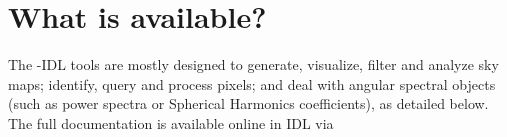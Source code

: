 \section{What is available?}



The \healpixns-IDL tools are mostly designed to 
generate, visualize, filter and analyze sky maps;
identify, query and process \healpix pixels; 
and deal with angular spectral objects (such as power spectra or Spherical
Harmonics coefficients), 
as detailed below.
The full documentation is available online in IDL via 
